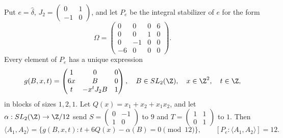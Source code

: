 \begin{proposition}[D.1.14; Proved]\label{st:D.1.14}
Put $e=\widehat\delta$,
$J_2=\left(\begin{smallmatrix}0&1\\-1&0\end{smallmatrix}\right)$,
and let $P_e$ be the integral stabilizer of $e$ for the form
\[
\Omega=\begin{pmatrix}0&0&0&6\\0&0&1&0\\0&-1&0&0\\-6&0&0&0\end{pmatrix}.
\]
Every element of $P_e$ has a unique expression
\[
g(B,x,t)=\begin{pmatrix}1&0&0\\6x&B&0\\t&-x^tJ_2B&1\end{pmatrix},
\quad B\in SL_2(\Z),\quad x\in\Z^2,\quad t\in\Z,
\]
in blocks of sizes $1,2,1$. Let
$Q(x)=x_1+x_2+x_1x_2$, and let
$\alpha:SL_2(\Z)\to\Z/12$ send
$S=\left(\begin{smallmatrix}0&-1\\1&0\end{smallmatrix}\right)$ to $9$
and $T=\left(\begin{smallmatrix}1&1\\0&1\end{smallmatrix}\right)$ to $1$.
Then
\[
\langle A_1,A_2\rangle
=\{g(B,x,t):t+6Q(x)-\alpha(B)=0\pmod{12}\},
\qquad [P_e:\langle A_1,A_2\rangle]=12.
\]
\end{proposition}
